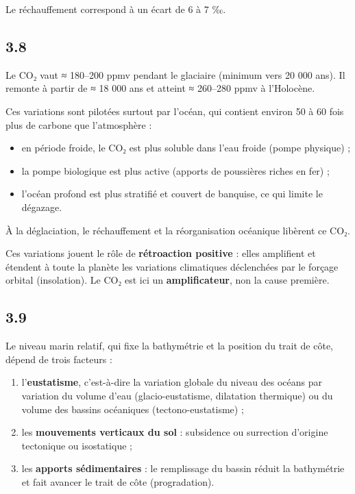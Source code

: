 \documentclass[11pt,a4paper]{article}
\providecommand{\tightlist}{\setlength{\itemsep}{0pt}\setlength{\parskip}{0pt}}
\begin{document}
Le réchauffement correspond à un écart de 6 à 7 ‰.

\hypertarget{section-35}{%
\subsection{3.8}\label{section-35}}

Le CO₂ vaut ≈ 180--200 ppmv pendant le glaciaire (minimum vers 20 000 ans). Il remonte à partir de ≈ 18 000 ans et atteint ≈ 260--280 ppmv à l'Holocène.

Ces variations sont pilotées surtout par l'océan, qui contient environ 50 à 60 fois plus de carbone que l'atmosphère :

\begin{itemize}
\tightlist
\item
  en période froide, le CO₂ est plus soluble dans l'eau froide (pompe physique) ;
\item
  la pompe biologique est plus active (apports de poussières riches en fer) ;
\item
  l'océan profond est plus stratifié et couvert de banquise, ce qui limite le dégazage.
\end{itemize}

À la déglaciation, le réchauffement et la réorganisation océanique libèrent ce CO₂.

Ces variations jouent le rôle de \textbf{rétroaction positive} : elles amplifient et étendent à toute la planète les variations climatiques déclenchées par le forçage orbital (insolation). Le CO₂ est ici un \textbf{amplificateur}, non la cause première.

\hypertarget{section-36}{%
\subsection{3.9}\label{section-36}}

Le niveau marin relatif, qui fixe la bathymétrie et la position du trait de côte, dépend de trois facteurs :

\begin{enumerate}
\def\labelenumi{\arabic{enumi}.}
\tightlist
\item
  l'\textbf{eustatisme}, c'est-à-dire la variation globale du niveau des océans par variation du volume d'eau (glacio-eustatisme, dilatation thermique) ou du volume des bassins océaniques (tectono-eustatisme) ;
\item
  les \textbf{mouvements verticaux du sol} : subsidence ou surrection d'origine tectonique ou isostatique ;
\item
  les \textbf{apports sédimentaires} : le remplissage du bassin réduit la bathymétrie et fait avancer le trait de côte (progradation).
\end{enumerate}
\end{document}
